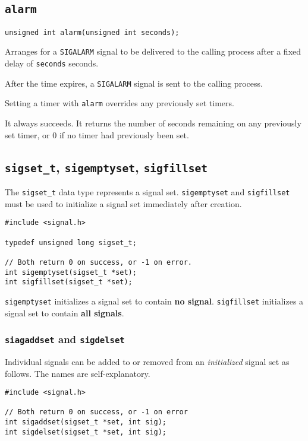 \documentclass{article}
\begin{document}
\subsection{\texttt{alarm}}

\begin{verbatim}
unsigned int alarm(unsigned int seconds);
\end{verbatim}

Arranges for a \texttt{SIGALARM} signal to be delivered to the calling process after a fixed delay of \texttt{seconds} seconds.

After the time expires, a \texttt{SIGALARM} signal is sent to the calling process.

Setting a timer with \texttt{alarm} overrides any previously set timers.

It always succeeds. It returns the number of seconds remaining on any previously set timer, or 0 if no timer had previously been set.


\subsection{\texttt{sigset\_t}, \texttt{sigemptyset}, \texttt{sigfillset}}

The \texttt{sigset\_t} data type represents a signal set. \texttt{sigemptyset} and \texttt{sigfillset} must be used to initialize a signal set immediately after creation.

\begin{verbatim}
#include <signal.h>

typedef unsigned long sigset_t;

// Both return 0 on success, or -1 on error.
int sigemptyset(sigset_t *set);
int sigfillset(sigset_t *set);
\end{verbatim}

\texttt{sigemptyset} initializes a signal set to contain \textbf{no signal}.
\texttt{sigfillset} initializes a signal set to contain \textbf{all signals}.


\subsubsection{\texttt{siagaddset} and \texttt{sigdelset}}

Individual signals can be added to or removed from an \textit{initialized} signal set as follows. The names are self-explanatory.

\begin{verbatim}
#include <signal.h>

// Both return 0 on success, or -1 on error
int sigaddset(sigset_t *set, int sig);
int sigdelset(sigset_t *set, int sig);
\end{verbatim}
\end{document}
